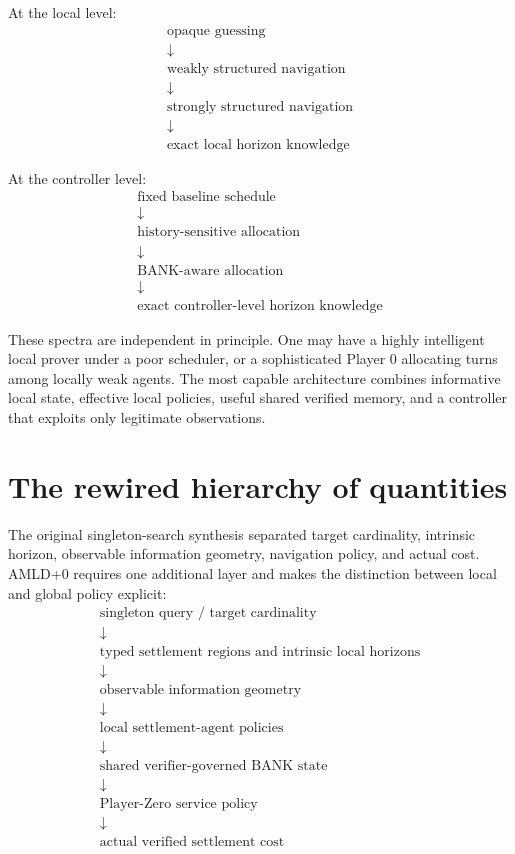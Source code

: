 \documentclass[11pt]{article}
\begin{document}
At the local level:
\[
\boxed{
\begin{array}{c}
\text{opaque guessing}\\
\downarrow\\
\text{weakly structured navigation}\\
\downarrow\\
\text{strongly structured navigation}\\
\downarrow\\
\text{exact local horizon knowledge}
\end{array}
}
\]

At the controller level:
\[
\boxed{
\begin{array}{c}
\text{fixed baseline schedule}\\
\downarrow\\
\text{history-sensitive allocation}\\
\downarrow\\
\text{BANK-aware allocation}\\
\downarrow\\
\text{exact controller-level horizon knowledge}
\end{array}
}
\]

These spectra are independent in principle.  One may have a highly intelligent
local prover under a poor scheduler, or a sophisticated Player 0 allocating
turns among locally weak agents.  The most capable architecture combines
informative local state, effective local policies, useful shared verified
memory, and a controller that exploits only legitimate observations.

\section{The rewired hierarchy of quantities}

The original singleton-search synthesis separated target cardinality,
intrinsic horizon, observable information geometry, navigation policy, and
actual cost.  AMLD+0 requires one additional layer and makes the distinction
between local and global policy explicit:
\[
\boxed{
\begin{array}{c}
\text{singleton query / target cardinality}\\[3pt]
\downarrow\\[-2pt]
\text{typed settlement regions and intrinsic local horizons}\\[3pt]
\downarrow\\[-2pt]
\text{observable information geometry}\\[3pt]
\downarrow\\[-2pt]
\text{local settlement-agent policies}\\[3pt]
\downarrow\\[-2pt]
\text{shared verifier-governed BANK state}\\[3pt]
\downarrow\\[-2pt]
\text{Player-Zero service policy}\\[3pt]
\downarrow\\[-2pt]
\text{actual verified settlement cost}
\end{array}}
\]
\end{document}
